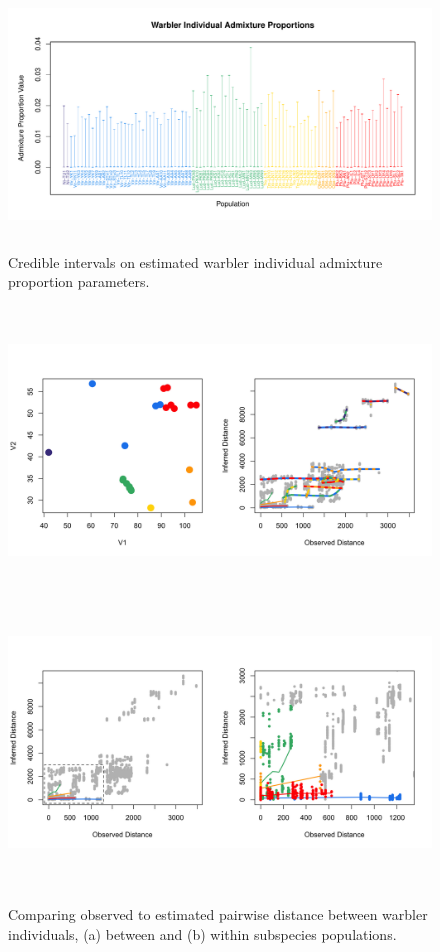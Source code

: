 \documentclass[12pt]{article}
\begin{document}
\begin{figure}
\centering
	{\includegraphics[width=5in,height=2.5in]{figs/warblers/warb_ind_adprop.pdf}}
	\caption{Credible intervals on estimated warbler individual admixture proportion parameters.}\label{sfig:warb_ind_adprops}
\end{figure}

\begin{figure}
	\centering
			{\includegraphics[width=6in,height=3in]{figs/warblers/warb_ind_dist_compare_allpairs.png}}
			{\includegraphics[width=6in,height=3in]{figs/warblers/warb_ind_dist_compare.png}}
	\caption{Comparing observed to estimated pairwise distance between warbler individuals, (a) between and (b) within subspecies populations.}\label{sfig:warb_ind_distcomp}
\end{figure}
\end{document}
